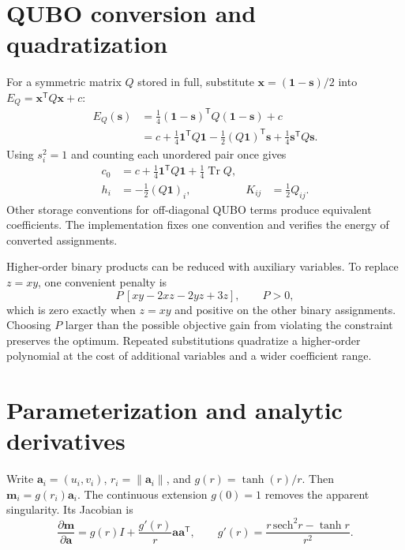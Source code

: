 \documentclass[
  aps,
  prx,
  reprint,
  amsmath,
  amssymb,
  groupedaddress,
  nofootinbib,
  floatfix,
  longbibliography
]{revtex4-2}
\newcommand{\Tr}{\operatorname{Tr}}
\begin{document}
\newpage
\section{QUBO conversion and quadratization}
\label{app:qubo}

For a symmetric matrix $Q$ stored in full, substitute
$\bm x=(\bm 1-\bm s)/2$ into $E_Q=\bm x^{\mathsf T}Q\bm x+c$:
\begin{align}
 E_Q(\bm s)
 &=\frac14(\bm 1-\bm s)^{\mathsf T}Q(\bm 1-\bm s)+c\nonumber\\
 &=c+\frac14\bm 1^{\mathsf T}Q\bm 1
   -\frac12(Q\bm 1)^{\mathsf T}\bm s
   +\frac14\bm s^{\mathsf T}Q\bm s.
 \label{eq:qubo-expansion}
\end{align}
Using $s_i^2=1$ and counting each unordered pair once gives
\begin{align}
 c_0&=c+\frac14\bm 1^{\mathsf T}Q\bm 1+\frac14\Tr Q,\nonumber\\
 h_i&=-\frac12(Q\bm 1)_i,
 &K_{ij}&=\frac12Q_{ij}.
 \label{eq:qubo-map}
\end{align}
Other storage conventions for off-diagonal QUBO terms produce equivalent
coefficients.  The implementation fixes one convention and verifies the
energy of converted assignments.

Higher-order binary products can be reduced with auxiliary variables.  To
replace $z=xy$, one convenient penalty is
\begin{equation}
 P\,[xy-2xz-2yz+3z], \qquad P>0,
 \label{eq:quadratization}
\end{equation}
which is zero exactly when $z=xy$ and positive on the other binary
assignments.  Choosing $P$ larger than the possible objective gain from
violating the constraint preserves the optimum.  Repeated substitutions
quadratize a higher-order polynomial at the cost of additional variables and
a wider coefficient range.

\section{Parameterization and analytic derivatives}
\label{app:param}

Write $\bm a_i=(u_i,v_i)$, $r_i=\|\bm a_i\|$, and
$g(r)=\tanh(r)/r$.  Then $\bm m_i=g(r_i)\bm a_i$.  The continuous extension
$g(0)=1$ removes the apparent singularity.  Its Jacobian is
\begin{equation}
 \frac{\partial\bm m}{\partial\bm a}
 =g(r)I+\frac{g'(r)}{r}\bm a\bm a^{\mathsf T},
 \qquad
 g'(r)=\frac{r\,\mathrm{sech}^2r-\tanh r}{r^2}.
 \label{eq:jacobian}
\end{equation}
\end{document}
